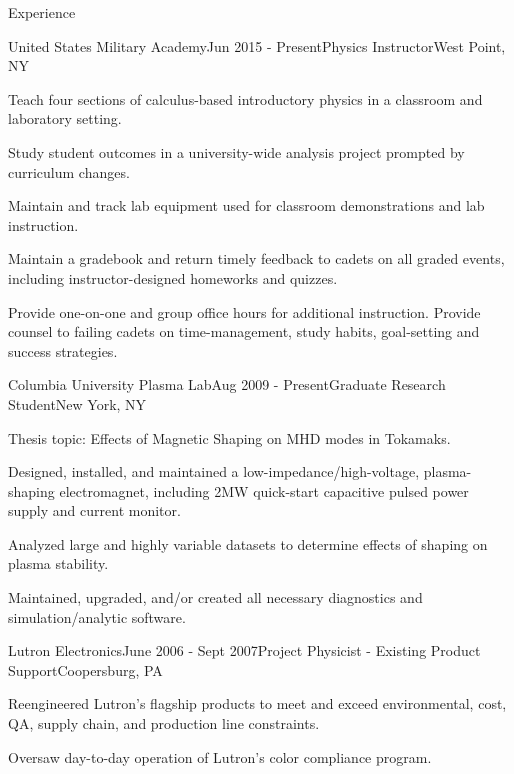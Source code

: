 \documentclass{resume} %
\begin{document}
\begin{rSection}{Experience}

\begin{rSubsection}{United States Military Academy}{Jun 2015 - Present}{Physics Instructor}{West Point, NY}
\item	Teach four sections of calculus-based introductory physics in a classroom and laboratory setting.
\item 	Study student outcomes in a university-wide analysis project prompted by curriculum changes.
\item	Maintain and track lab equipment used for classroom demonstrations and lab instruction.
\item   Maintain a gradebook and return timely feedback to cadets on all graded events, including instructor-designed homeworks and quizzes.
\item 	Provide one-on-one and group office hours for additional instruction.  Provide counsel to failing cadets on time-management, study habits, goal-setting and success strategies.

\end{rSubsection}


\begin{rSubsection}{Columbia University Plasma Lab}{Aug 2009 - Present}{Graduate Research Student}{New York, NY}
\item	Thesis topic: Effects of Magnetic Shaping on MHD modes in Tokamaks.
\item	Designed, installed, and maintained a low-impedance/high-voltage, plasma-shaping electromagnet, including 2MW quick-start capacitive pulsed power supply and current monitor.
\item	Analyzed large and highly variable datasets to determine effects of shaping on plasma stability.
\item   Maintained, upgraded, and/or created all necessary diagnostics and simulation/analytic software.

\end{rSubsection}

\begin{rSubsection}{Lutron Electronics}{June 2006 - Sept 2007}{Project Physicist - Existing Product Support}{Coopersburg, PA}
\item	Reengineered Lutron's flagship products to meet and exceed environmental, cost, QA, supply chain, and production line constraints.
\item	Oversaw day-to-day operation of Lutron’s color compliance program.


\end{rSubsection}
\end{rSection}
\end{document}

